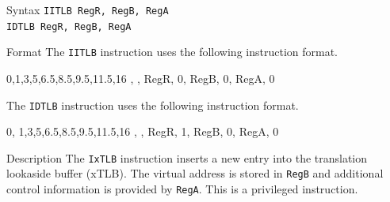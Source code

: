 %
%
\pagebreak
{}

\begin{iPageDescEntry}{Syntax}
    \texttt{IITLB RegR, RegB, RegA} \\
    \texttt{IDTLB RegR, RegB, RegA}
\end{iPageDescEntry}

\begin{iPageDescEntry}{Format}
    The \texttt{IITLB} instruction uses the following instruction format. \\

    \begin{flushleft}
    \drawInstrFormat
        {0,1,3,5,6.5,8.5,9.5,11.5,16}
        {\OpCodeGrpSYS, \OpCodePTLB, RegR, 0, RegB, 0, RegA, 0}
    \end{flushleft}
    
    The \texttt{IDTLB} instruction uses the following instruction format. \\

    \begin{flushleft}
    \drawInstrFormat
        {0, 1,3,5,6.5,8.5,9.5,11.5,16}
        {\OpCodeGrpSYS, \OpCodePTLB, RegR, 1, RegB, 0, RegA, 0}
    \end{flushleft}

\end{iPageDescEntry}

\begin{iPageDescEntry}{Description}
    The \texttt{IxTLB} instruction inserts a new entry into the translation lookaside buffer (xTLB). The virtual address is stored in \texttt{RegB} and additional control information is provided by \texttt{RegA}. This is a privileged instruction.
\end{iPageDescEntry}


